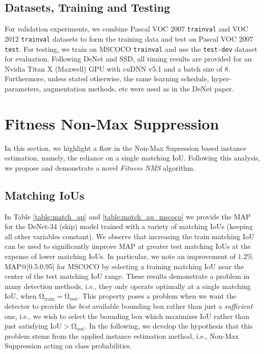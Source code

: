 \documentclass[10pt,twocolumn,letterpaper]{article}
\begin{document}
\subsection{Datasets, Training and Testing}

For validation experiments, we combine Pascal VOC\cite{pascal-voc} 2007 \texttt{trainval} and VOC 2012 \texttt{trainval} datasets to form the training data and test on Pascal VOC 2007 \texttt{test}. For testing, we train on MSCOCO\cite{mscoco} \texttt{trainval} and use the \texttt{test-dev} dataset for evaluation. Following DeNet\cite{denet} and SSD\cite{ssd}, all timing results are provided for an Nvidia Titan X (Maxwell) GPU with cuDNN v5.1 and a batch size of 8. Furthermore, unless stated otherwise, the same learning schedule, hyper-parameters, augmentation methods, etc were used as in the DeNet paper\cite{denet}.

\section{Fitness Non-Max Suppression}

In this section, we highlight a flaw in the Non-Max Supression based instance estimation, namely, the reliance on a single matching IoU. Following this analysis, we propose and demonstrate a novel \textit{Fitness NMS} algorithm. 

\subsection{Matching IoUs}

In Table \ref{table:match_ap} and \ref{table:match_ap_mscoco} we provide the MAP for the DeNet-34 (skip)\cite{denet} model trained with a variety of matching IoUs (keeping all other variables constant). We observe that increasing the train matching IoU can be used to significantly improve MAP at greater test matching IoUs at the expense of lower matching IoUs. In particular, we note an improvement of $1.2\%$ MAP@[0.5:0.95] for MSCOCO by selecting a training matching IoU near the center of the test matching IoU range. These results demonstrate a problem in many detection methods, i.e., they only operate optimally at a single matching IoU, when $\bm{\mathrm{\Omega_{train}}} = \bm{\mathrm{\Omega_{test}}}$. This property poses a problem when we want the detector to provide the \textit{best} available bounding box rather than just a \textit{sufficient} one, i.e., we wish to select the bounding box which maximizes IoU rather than just satisfying $\mathrm{IoU} > \bm{\mathrm{\Omega_{test}}}$. In the following, we develop the hypothesis that this problem stems from the applied instance estimation method, i.e., Non-Max Suppression acting on class probabilities. 
\end{document}
